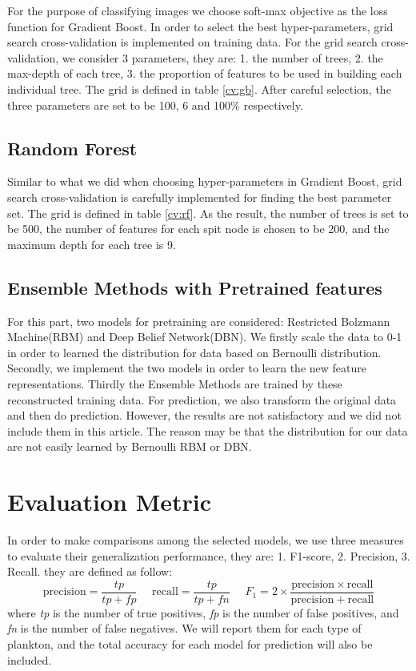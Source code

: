 \documentclass[11pt,oneside,a4paper]{article}
\numberwithin{equation}{section}
\begin{document}
For the purpose of classifying images we choose soft-max objective as the loss function for Gradient Boost. In order to select the best hyper-parameters, grid search cross-validation is implemented on training data. For the grid search cross-validation, we consider 3 parameters, they are: 1. the number of trees, 2. the max-depth of each tree, 3. the proportion of features to be used in building each individual tree. The grid is defined in table \ref{cv:gb}. After careful selection, the three parameters are set to be 100, 6 and 100\% respectively.

\subsection{Random Forest}

Similar to what we did when choosing hyper-parameters in Gradient Boost, grid search cross-validation is carefully implemented for finding the best parameter set. The grid is defined in table \ref{cv:rf}. As the result, the number of trees is set to be 500, the number of features for each spit node is chosen to be 200, and the maximum depth for each tree is 9.

\subsection{Ensemble Methods with Pretrained features}
For this part, two models for pretraining are considered: Restricted Bolzmann Machine(RBM) and Deep Belief Network(DBN). We firstly scale the data to 0-1 in order to learned the distribution for data based on Bernoulli distribution. Secondly, we implement the two models in order to learn the new feature representations. Thirdly the Ensemble Methods are trained by these reconstructed training data. For prediction, we also transform the original data and then do prediction. However, the results are not satisfactory and we did not include them in this article. The reason may be that the distribution for our data are not easily learned by Bernoulli RBM or DBN.

\section{Evaluation Metric}
In order to make comparisons among the selected models, we use three measures to evaluate their generalization performance, they are: 1. F1-score, 2. Precision, 3. Recall. they are defined as follow:
$$\mathrm{precision} = \frac{tp}{tp + fp}~~~~~~
\mathrm{recall} = \frac{{tp}}{{tp + fn}}~~~~~~
F_{1} = 2 \times \frac{\mathrm{precision} \times \mathrm{recall}}{\mathrm{precision} + \mathrm{recall}}$$
where \textit{tp} is the number of true positives, \textit{fp} is the number of false positives, and \textit{fn} is the number of false negatives. We will report them for each type of plankton, and the total accuracy for each model for prediction will also be included.
\end{document}

